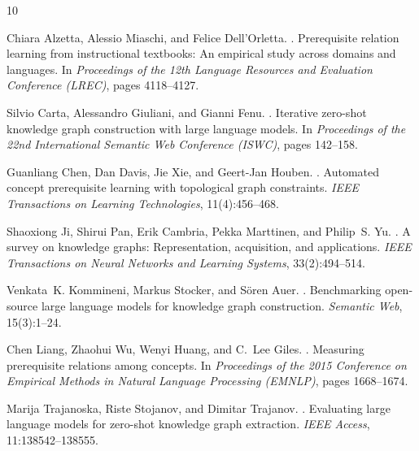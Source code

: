 \documentclass[11pt,a4paper]{article}
\begin{document}
\begin{thebibliography}{10}

Chiara Alzetta, Alessio Miaschi, and Felice Dell'Orletta.
.
\newblock Prerequisite relation learning from instructional textbooks: An empirical study across domains and languages.
\newblock In \emph{Proceedings of the 12th Language Resources and Evaluation Conference (LREC)}, pages 4118--4127.

Silvio Carta, Alessandro Giuliani, and Gianni Fenu.
.
\newblock Iterative zero-shot knowledge graph construction with large language models.
\newblock In \emph{Proceedings of the 22nd International Semantic Web Conference (ISWC)}, pages 142--158.

Guanliang Chen, Dan Davis, Jie Xie, and Geert-Jan Houben.
.
\newblock Automated concept prerequisite learning with topological graph constraints.
\newblock \emph{IEEE Transactions on Learning Technologies}, 11(4):456--468.

Shaoxiong Ji, Shirui Pan, Erik Cambria, Pekka Marttinen, and Philip~S. Yu.
.
\newblock A survey on knowledge graphs: Representation, acquisition, and applications.
\newblock \emph{IEEE Transactions on Neural Networks and Learning Systems}, 33(2):494--514.

Venkata~K. Kommineni, Markus Stocker, and S{\"o}ren Auer.
.
\newblock Benchmarking open-source large language models for knowledge graph construction.
\newblock \emph{Semantic Web}, 15(3):1--24.

Chen Liang, Zhaohui Wu, Wenyi Huang, and C.~Lee Giles.
.
\newblock Measuring prerequisite relations among concepts.
\newblock In \emph{Proceedings of the 2015 Conference on Empirical Methods in Natural Language Processing (EMNLP)}, pages 1668--1674.

Marija Trajanoska, Riste Stojanov, and Dimitar Trajanov.
.
\newblock Evaluating large language models for zero-shot knowledge graph extraction.
\newblock \emph{IEEE Access}, 11:138542--138555.

\end{thebibliography}
\end{document}
